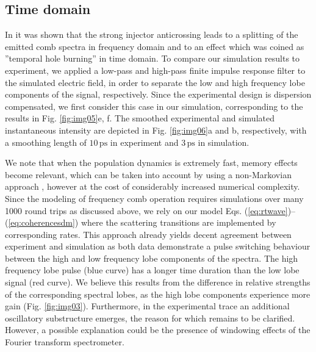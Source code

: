 \documentclass[10pt,letterpaper]{article}%
\begin{document}
\subsection{Time domain}

\label{sec:timedomain}

In \cite{burghoff2015evaluating} it was shown that the strong injector
anticrossing leads to a splitting of the emitted comb spectra in frequency
domain and to an effect which was coined as ''temporal hole burning'' in time
domain. To compare our simulation results to experiment, we applied a low-pass
and high-pass finite impulse response filter to the simulated electric field,
in order to separate the low and high frequency lobe components of the signal,
respectively. Since the experimental design is dispersion compensated, we
first consider this case in our simulation, corresponding to the results in
Fig. \ref{fig:img05}e, f. The smoothed experimental and simulated
instantaneous intensity are depicted in Fig. \ref{fig:img06}a and b,
respectively, with a smoothing length of\textrm{ }$10{\,}\mathrm{ps}$ in experiment
 and $3{\,}\mathrm{ps}$ in simulation.

We note that when the population dynamics is extremely fast,
memory effects become relevant, which can be taken into account by using a non-Markovian approach \cite{butscher2005ultrafast, knezevic2013time}, however at the cost of
considerably increased numerical complexity. Since the modeling of frequency comb
operation requires simulations over many 1000 round trips as discussed above,
we rely on our model Eqs. (\ref{eq:rtwave})--(\ref{eq:coherencesdm})
where the scattering transitions are implemented by corresponding rates.
This approach already yields decent agreement between experiment and simulation as both data
demonstrate a pulse switching behaviour between the high and low frequency
lobe components of the spectra. The high frequency lobe pulse (blue curve) has
a longer time duration than the low lobe signal (red curve). We believe this
results from the difference in relative strengths of the corresponding
spectral lobes, as the high lobe components experience more gain (Fig.
\ref{fig:img03}). Furthermore, in the experimental trace an additional
oscillatory substructure emerges, the reason for which remains to be clarified. However, a possible explanation could be 
the presence of windowing effects of the Fourier transform spectrometer. 
\end{document}
